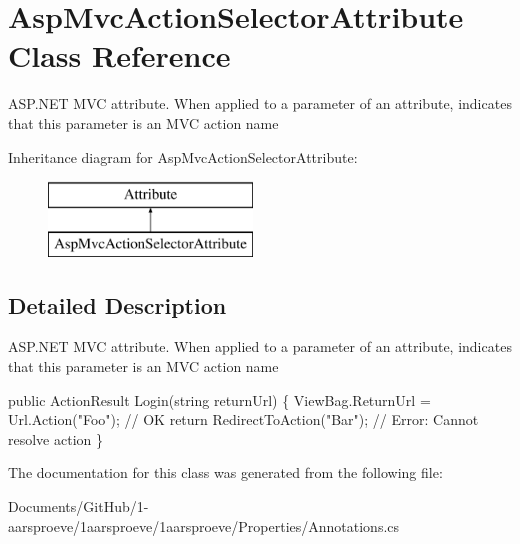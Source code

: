 \hypertarget{class_asp_mvc_action_selector_attribute}{}\section{Asp\+Mvc\+Action\+Selector\+Attribute Class Reference}
\label{class_asp_mvc_action_selector_attribute}


A\+S\+P.\+N\+E\+T M\+V\+C attribute. When applied to a parameter of an attribute, indicates that this parameter is an M\+V\+C action name  


Inheritance diagram for Asp\+Mvc\+Action\+Selector\+Attribute\+:\begin{figure}[H]
\begin{center}
\leavevmode
\includegraphics[height=2.000000cm]{class_asp_mvc_action_selector_attribute}
\end{center}
\end{figure}


\subsection{Detailed Description}
A\+S\+P.\+N\+E\+T M\+V\+C attribute. When applied to a parameter of an attribute, indicates that this parameter is an M\+V\+C action name 


\begin{DoxyCode}
\textcolor{keyword}{public} ActionResult Login(\textcolor{keywordtype}{string} returnUrl) \{
  ViewBag.ReturnUrl = Url.Action(\textcolor{stringliteral}{"Foo"}); \textcolor{comment}{// OK}
  \textcolor{keywordflow}{return} RedirectToAction(\textcolor{stringliteral}{"Bar"}); \textcolor{comment}{// Error: Cannot resolve action}
\}
\end{DoxyCode}


The documentation for this class was generated from the following file\+:\begin{DoxyCompactItemize}
\item 
Documents/\+Git\+Hub/1-\/aarsproeve/1aarsproeve/1aarsproeve/\+Properties/Annotations.\+cs\end{DoxyCompactItemize}

